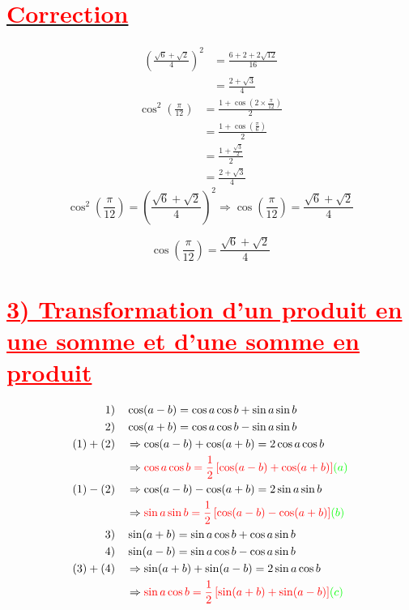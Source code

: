 \documentclass[a4paper,12pt]{article}
\begin{document}
\section*{\underline{\textcolor{red}{Correction}}}

\[
\begin{aligned}
\left(\frac{\sqrt{6} + \sqrt{2}}{4}\right)^2 &= \frac{6 + 2 + 2\sqrt{12}}{16} \\
&= \frac{2 + \sqrt{3}}{4}
\end{aligned}
\]
\vspace{1cm}
\[
\begin{aligned}
\cos^2\left(\frac{\pi}{12}\right) 
&= \frac{1 + \cos\left(2 \times \frac{\pi}{12}\right)}{2} \\
&= \frac{1 + \cos\left(\frac{\pi}{6}\right)}{2} \\
&= \frac{1 + \frac{\sqrt{3}}{2}}{2} \\
&= \frac{2 + \sqrt{3}}{4}
\end{aligned}
\]
\vspace{1cm}
\[
\cos^2\left(\frac{\pi}{12}\right)
= \left( \frac{\sqrt{6} + \sqrt{2}}{4} \right)^2
\Rightarrow \cos\left(\frac{\pi}{12}\right) = \frac{\sqrt{6} + \sqrt{2}}{4}
\]

\[
\boxed{ \cos\left( \frac{\pi}{12} \right) = \frac{\sqrt{6} + \sqrt{2}}{4} }
\]

\section*{\textcolor{red}{\underline{3) Transformation d’un produit en une somme et d'une somme en produit}}}

\[
\begin{aligned}
\text{1)}\quad &\cos(a - b) = \cos a \cos b + \sin a \sin b \\
\text{2)}\quad &\cos(a + b) = \cos a \cos b - \sin a \sin b \\
(1) + (2)\quad &\Rightarrow \cos(a - b) + \cos(a + b) = 2\cos a \cos b \\
\quad &\Rightarrow \textcolor{red}{\cos a \cos b = \frac{1}{2}\left[\cos(a - b) + \cos(a + b)\right]} \textcolor{green}{(a)} \\
(1) - (2)\quad &\Rightarrow \cos(a - b) - \cos(a + b) = 2\sin a \sin b \\
\quad &\Rightarrow \textcolor{red}{\sin a \sin b = \frac{1}{2}\left[\cos(a - b) - \cos(a + b)\right]} \textcolor{green}{(b)} \\
\text{3)}\quad &\sin(a + b) = \sin a \cos b + \cos a \sin b \\
\text{4)}\quad &\sin(a - b) = \sin a \cos b - \cos a \sin b \\
(3) + (4)\quad &\Rightarrow \sin(a + b) + \sin(a - b) = 2\sin a \cos b \\
\quad &\Rightarrow \textcolor{red}{\sin a \cos b = \frac{1}{2}\left[\sin(a + b) + \sin(a - b)\right]} \textcolor{green}{(c)}
\end{aligned}
\]
\end{document}
